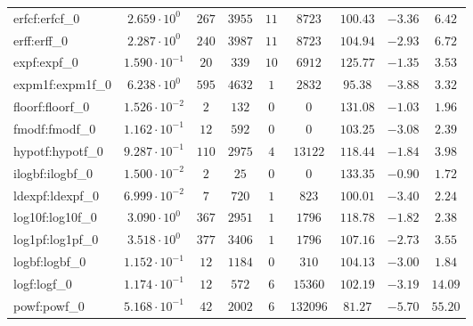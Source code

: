 \begin{tabular}{|l|c|c|c|c|c|c|c|c|}
erfcf:erfcf\_0               & $ 2.659 \cdot 10^{0}  $ & $ 267    $ & $ 3955   $ & $ 11  $ & $ 8723   $ & $ 100.43      $ & $ -3.36   $ & $ 6.42    $ \\
erff:erff\_0                 & $ 2.287 \cdot 10^{0}  $ & $ 240    $ & $ 3987   $ & $ 11  $ & $ 8723   $ & $ 104.94      $ & $ -2.93   $ & $ 6.72    $ \\
expf:expf\_0                 & $ 1.590 \cdot 10^{-1} $ & $ 20     $ & $ 339    $ & $ 10  $ & $ 6912   $ & $ 125.77      $ & $ -1.35   $ & $ 3.53    $ \\
expm1f:expm1f\_0             & $ 6.238 \cdot 10^{0}  $ & $ 595    $ & $ 4632   $ & $ 1   $ & $ 2832   $ & $ 95.38       $ & $ -3.88   $ & $ 3.32    $ \\
floorf:floorf\_0             & $ 1.526 \cdot 10^{-2} $ & $ 2      $ & $ 132    $ & $ 0   $ & $ 0      $ & $ 131.08      $ & $ -1.03   $ & $ 1.96    $ \\
fmodf:fmodf\_0               & $ 1.162 \cdot 10^{-1} $ & $ 12     $ & $ 592    $ & $ 0   $ & $ 0      $ & $ 103.25      $ & $ -3.08   $ & $ 2.39    $ \\
hypotf:hypotf\_0             & $ 9.287 \cdot 10^{-1} $ & $ 110    $ & $ 2975   $ & $ 4   $ & $ 13122  $ & $ 118.44      $ & $ -1.84   $ & $ 3.98    $ \\
ilogbf:ilogbf\_0             & $ 1.500 \cdot 10^{-2} $ & $ 2      $ & $ 25     $ & $ 0   $ & $ 0      $ & $ 133.35      $ & $ -0.90   $ & $ 1.72    $ \\
ldexpf:ldexpf\_0             & $ 6.999 \cdot 10^{-2} $ & $ 7      $ & $ 720    $ & $ 1   $ & $ 823    $ & $ 100.01      $ & $ -3.40   $ & $ 2.24    $ \\
log10f:log10f\_0             & $ 3.090 \cdot 10^{0}  $ & $ 367    $ & $ 2951   $ & $ 1   $ & $ 1796   $ & $ 118.78      $ & $ -1.82   $ & $ 2.38    $ \\
log1pf:log1pf\_0             & $ 3.518 \cdot 10^{0}  $ & $ 377    $ & $ 3406   $ & $ 1   $ & $ 1796   $ & $ 107.16      $ & $ -2.73   $ & $ 3.55    $ \\
logbf:logbf\_0               & $ 1.152 \cdot 10^{-1} $ & $ 12     $ & $ 1184   $ & $ 0   $ & $ 310    $ & $ 104.13      $ & $ -3.00   $ & $ 1.84    $ \\
logf:logf\_0                 & $ 1.174 \cdot 10^{-1} $ & $ 12     $ & $ 572    $ & $ 6   $ & $ 15360  $ & $ 102.19      $ & $ -3.19   $ & $ 14.09   $ \\
powf:powf\_0                 & $ 5.168 \cdot 10^{-1} $ & $ 42     $ & $ 2002   $ & $ 6   $ & $ 132096 $ & $ 81.27       $ & $ -5.70   $ & $ 55.20   $ \\

\end{tabular}
